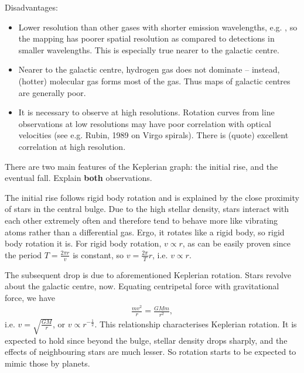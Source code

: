 \documentclass[a4paper,11pt]{exam}
\begin{document}
\begin{questions}
\begin{solution}
		Disadvantages:
		\begin{itemize}
			\item Lower resolution than other gases with shorter emission wavelengths, e.g. , so the mapping has poorer spatial resolution as compared to detections in smaller wavelengths. This is especially true nearer to the galactic centre.
			\item Nearer to the galactic centre, hydrogen gas does not dominate -- instead, (hotter) molecular gas forms most of the gas. Thus  maps of galactic centres are generally poor.
			\item It is necessary to observe at high resolutions. Rotation curves from  line observations at low resolutions may have poor correlation with optical velocities (see e.g. Rubin, 1989 on Virgo spirals). There is (quote) excellent correlation at high resolution.
		\end{itemize}
	\end{solution}

\filbreak
{}

\question[4] 
	There are two main features of the Keplerian graph: the initial rise, and the eventual fall. Explain \textbf{both} observations.
	\droppoints
	\begin{solution}
		The initial rise follows rigid body rotation and is explained by the close proximity of stars in the central bulge. Due to the high stellar density, stars interact with each other extremely often and therefore tend to behave more like vibrating atoms rather than a differential gas. Ergo, it rotates like a rigid body, so rigid body rotation it is. For rigid body rotation, $v\propto r$, as can be easily proven since the period $T = \frac{2\pi r}{v}$ is constant, so $v = \frac{2\pi}{T}r$, i.e. $v\propto r$.
		
		The subsequent drop is due to aforementioned Keplerian rotation. Stars revolve about the galactic centre, now. Equating centripetal force with gravitational force, we have
		\begin{align*}
		\frac{mv^2}{r} = \frac{GMm}{r^2},
		\end{align*}
		i.e. $v = \sqrt{\frac{GM}{r}}$, or $v\propto r^{-\frac{1}{2}}$. This relationship characterises Keplerian rotation. It is expected to hold since beyond the bulge, stellar density drops sharply, and the effects of neighbouring stars are much lesser. So rotation starts to be expected to mimic those by planets.
		

\end{solution}
\end{questions}
\end{document}
